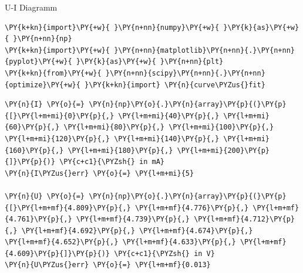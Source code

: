 
    U-I Diagramm

    \begin{tcolorbox}[breakable, size=fbox, boxrule=1pt, pad at break*=1mm,colback=cellbackground, colframe=cellborder]
\begin{Verbatim}[commandchars=\\\{\}]
\PY{k+kn}{import}\PY{+w}{ }\PY{n+nn}{numpy}\PY{+w}{ }\PY{k}{as}\PY{+w}{ }\PY{n+nn}{np}
\PY{k+kn}{import}\PY{+w}{ }\PY{n+nn}{matplotlib}\PY{n+nn}{.}\PY{n+nn}{pyplot}\PY{+w}{ }\PY{k}{as}\PY{+w}{ }\PY{n+nn}{plt}
\PY{k+kn}{from}\PY{+w}{ }\PY{n+nn}{scipy}\PY{n+nn}{.}\PY{n+nn}{optimize}\PY{+w}{ }\PY{k+kn}{import} \PY{n}{curve\PYZus{}fit}
\end{Verbatim}
\end{tcolorbox}

    \begin{tcolorbox}[breakable, size=fbox, boxrule=1pt, pad at break*=1mm,colback=cellbackground, colframe=cellborder]
\begin{Verbatim}[commandchars=\\\{\}]
\PY{n}{I} \PY{o}{=} \PY{n}{np}\PY{o}{.}\PY{n}{array}\PY{p}{(}\PY{p}{[}\PY{l+m+mi}{0}\PY{p}{,} \PY{l+m+mi}{40}\PY{p}{,} \PY{l+m+mi}{60}\PY{p}{,} \PY{l+m+mi}{80}\PY{p}{,} \PY{l+m+mi}{100}\PY{p}{,} \PY{l+m+mi}{120}\PY{p}{,} \PY{l+m+mi}{140}\PY{p}{,} \PY{l+m+mi}{160}\PY{p}{,} \PY{l+m+mi}{180}\PY{p}{,} \PY{l+m+mi}{200}\PY{p}{]}\PY{p}{)} \PY{c+c1}{\PYZsh{} in mA}
\PY{n}{I\PYZus{}err} \PY{o}{=} \PY{l+m+mi}{5}

\PY{n}{U} \PY{o}{=} \PY{n}{np}\PY{o}{.}\PY{n}{array}\PY{p}{(}\PY{p}{[}\PY{l+m+mf}{4.809}\PY{p}{,} \PY{l+m+mf}{4.776}\PY{p}{,} \PY{l+m+mf}{4.761}\PY{p}{,} \PY{l+m+mf}{4.739}\PY{p}{,} \PY{l+m+mf}{4.712}\PY{p}{,} \PY{l+m+mf}{4.692}\PY{p}{,} \PY{l+m+mf}{4.674}\PY{p}{,} \PY{l+m+mf}{4.652}\PY{p}{,} \PY{l+m+mf}{4.633}\PY{p}{,} \PY{l+m+mf}{4.609}\PY{p}{]}\PY{p}{)} \PY{c+c1}{\PYZsh{} in V}
\PY{n}{U\PYZus{}err} \PY{o}{=} \PY{l+m+mf}{0.013}
\end{Verbatim}
\end{tcolorbox}

